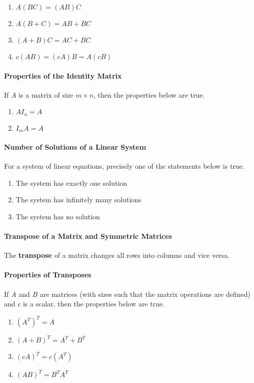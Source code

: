 \documentclass{report}
\begin{document}
\begin{enumerate}
    \item $A(BC) = (AB)C$
    \item $A(B+C) = AB + BC$
    \item $(A+B)C = AC + BC$
    \item $c(AB) = (cA)B = A(cB)$
\end{enumerate}

\paragraph{Properties of the Identity Matrix} If $A$ is a matrix of size $m \times n$, then the properties below are true.

\begin{enumerate}
    \item $AI_n = A$
    \item $I_m A = A$
\end{enumerate}

\paragraph{Number of Solutions of a Linear System} For a system of linear equations, precisely one of the statements below is true.
\begin{enumerate}
    \item The system has exactly one solution
    \item The system has infinitely many solutions
    \item The system has no solution
\end{enumerate}

\paragraph{Transpose of a Matrix and Symmetric Matrices} The \textbf{transpose} of a matrix changes all rows into columns and vice versa.

\paragraph{Properties of Transposes} If $A$ and $B$ are matrices (with sizes such that the matrix operations are defined) and $c$ is a scalar, then the properties below are true.

\begin{enumerate}
    \item $\left(A^T\right)^T = A$
    \item $\left( A + B \right) ^ T = A^T + B^T$
    \item $\left(cA\right)^T = c\left(A^T\right)$
    \item $(AB)^T = B^TA^T$
\end{enumerate}
\end{document}
